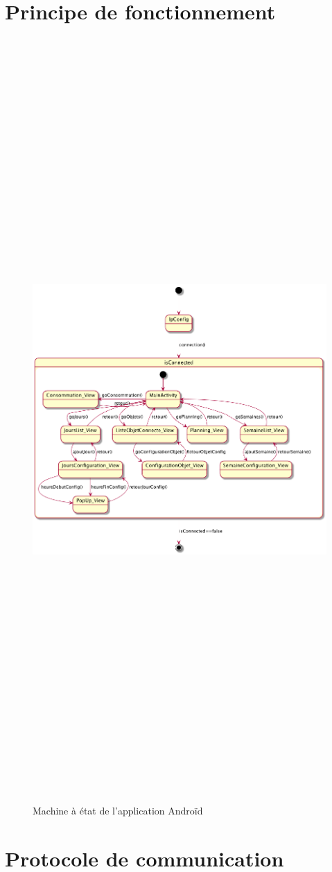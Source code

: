 \documentclass[11pt,a4paper]{report} %
\begin{document}
		
		\section{Principe de fonctionnement}
		\begin{figure}[H]
			\centering
			\includegraphics[width = 18cm ,height = 30cm,keepaspectratio]{./Picture/machine a etat java.png}
			\caption{Machine à état de l'application Androïd} 
			\label{diagClass}
		\end{figure}
		\newpage
		
		
		
		
		\section{Protocole de communication}
		
\tableofcontents
\listoffigures
\listoftables
		
\end{document}
